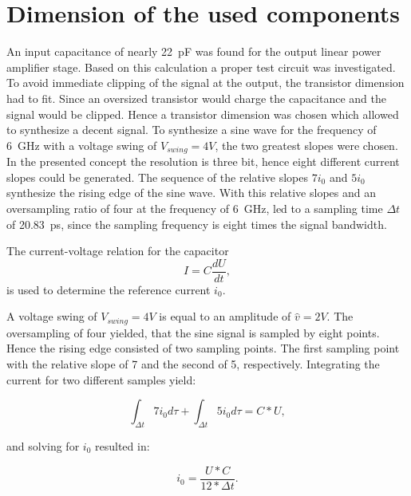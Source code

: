 \section{Dimension of the used components}
An input capacitance of nearly \SI{22}{\pico \farad} was found for the output linear power amplifier stage.
Based on this calculation a proper test circuit was investigated.
To avoid immediate clipping of the signal at the output, the transistor dimension had to fit.
Since an oversized transistor would charge the capacitance and the signal would be clipped.
Hence a transistor dimension was chosen which allowed to synthesize a decent signal.
To synthesize a sine wave for the frequency of \SI{6}{\giga \hertz} with a voltage swing of $V_{swing} = 4V$, the two greatest slopes were chosen.
In the presented concept the resolution is three bit, hence eight different current slopes could be generated.
The sequence of the relative slopes $7 i_0$ and $5 i_0$ synthesize the rising edge of the sine wave.
With this relative slopes and an oversampling ratio of four at the frequency of \SI{6}{\giga \hertz}, led to a sampling time $\Delta t$ of \SI{20.83}{\pico \second}, since the sampling frequency is eight times the signal bandwidth.

The current-voltage relation for the capacitor
\begin{equation}
	I = C \frac{d U}{d t},
\end{equation}
is used to determine the reference current $i_0$.

A voltage swing of $V_{swing} = 4V$ is equal to an amplitude of $\hat{v} = 2V$.
The oversampling of four yielded, that the sine signal is sampled by eight points.
Hence the rising edge consisted of two sampling points.
The first sampling point with the relative slope of 7 and the second of 5, respectively.
Integrating the current for two different samples yield:

\begin{equation}
\int_{\Delta t} 7 i_0 d\tau + \int_{\Delta t} 5 i_0 d \tau = C*U,
\end{equation}

and solving for $i_0$ resulted in:

\begin{equation}
i_0 = \frac{U*C}{12*\Delta t}.
\end{equation}

